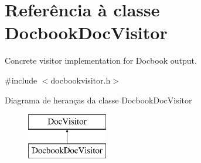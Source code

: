 \hypertarget{class_docbook_doc_visitor}{\section{Referência à classe Docbook\-Doc\-Visitor}
\label{class_docbook_doc_visitor}
}


Concrete visitor implementation for Docbook output.  




{\ttfamily \#include $<$docbookvisitor.\-h$>$}

Diagrama de heranças da classe Docbook\-Doc\-Visitor\begin{figure}[H]
\begin{center}
\leavevmode
\includegraphics[height=2.000000cm]{class_docbook_doc_visitor}
\end{center}
\end{figure}
